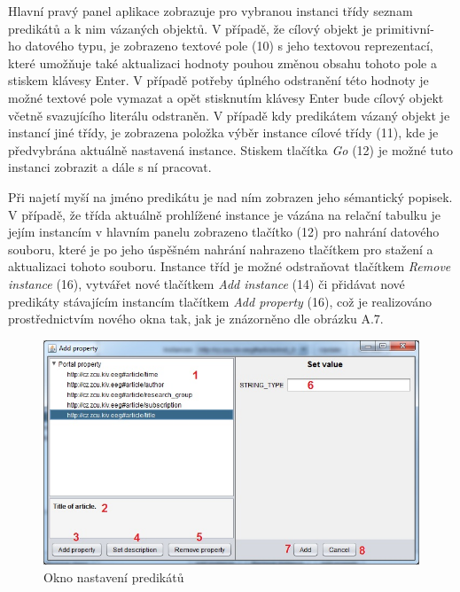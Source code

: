 \documentclass{projekt}
\begin{document}
Hlavní pravý panel aplikace zobrazuje pro vybranou instanci třídy seznam predikátů a k nim vázaných objektů. V případě, že cílový objekt je primitivní-\\ho datového typu, je zobrazeno textové pole (10) s jeho textovou reprezentací, které umožňuje také aktualizaci hodnoty pouhou změnou obsahu tohoto pole a stiskem klávesy Enter. V případě potřeby úplného odstranění této hodnoty je možné textové pole vymazat a opět stisknutím klávesy Enter bude cílový objekt včetně svazujícího literálu odstraněn. V případě kdy predikátem vázaný objekt je instancí jiné třídy, je zobrazena položka výběr instance cílové třídy (11), kde je předvybrána aktuálně nastavená instance. Stiskem tlačítka {\it Go} (12) je možné tuto instanci zobrazit a dále s ní pracovat.


Při najetí myší na jméno predikátu je nad ním zobrazen jeho sémantický popisek. V případě, že třída aktuálně prohlížené instance je vázána na relační tabulku je jejím instancím v hlavním panelu zobrazeno tlačítko (12) pro nahrání datového souboru, které je po jeho úspěšném nahrání nahrazeno tlačítkem pro stažení a aktualizaci tohoto souboru. Instance tříd je možné odstraňovat tlačítkem {\it Remove instance} (16), vytvářet nové tlačítkem {\it Add instance} (14) či přidávat nové predikáty stávajícím instancím tlačítkem {\it Add property} (16), což je realizováno prostřednictvím nového okna tak, jak je znázorněno dle obrázku A.7.

\begin{figure}[htb!]
\begin{center}
\includegraphics[scale=0.72]{manualTestProperty.jpg}
\caption{Okno nastavení predikátů}
\end{center}
\end{figure}
\end{document}

